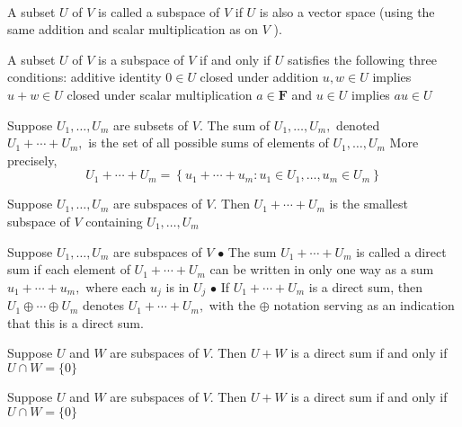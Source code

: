  \\

A subset $U$ of $V$ is called a subspace of $V$ if $U$ is also a vector space (using the same addition and scalar multiplication as on $V$ ).

A subset $U$ of $V$ is a subspace of $V$ if and only if $U$ satisfies the following three conditions:
additive identity
$0 \in U$
closed under addition $u, w \in U$ implies $u+w \in U$
closed under scalar multiplication
$a \in \mathbf{F}$ and $u \in U$ implies $a u \in U$

Suppose $U_{1}, \ldots, U_{m}$ are subsets of $V .$ The sum of $U_{1}, \ldots, U_{m},$ denoted $U_{1}+\cdots+U_{m},$ is the set of all possible sums of elements of $U_{1}, \ldots, U_{m}$ More precisely,
$$
U_{1}+\cdots+U_{m}=\left\{u_{1}+\cdots+u_{m}: u_{1} \in U_{1}, \ldots, u_{m} \in U_{m}\right\}
$$

Suppose $U_{1}, \ldots, U_{m}$ are subspaces of $V .$ Then $U_{1}+\cdots+U_{m}$ is the smallest subspace of $V$ containing $U_{1}, \ldots, U_{m}$

Suppose $U_{1}, \ldots, U_{m}$ are subspaces of $V$
$\bullet$ The sum $U_{1}+\cdots+U_{m}$ is called a direct sum if each element of $U_{1}+\cdots+U_{m}$ can be written in only one way as a sum $u_{1}+\cdots+u_{m},$ where each $u_{j}$ is in $U_{j}$
$\bullet$ If $U_{1}+\cdots+U_{m}$ is a direct sum, then $U_{1} \oplus \cdots \oplus U_{m}$ denotes $U_{1}+\cdots+U_{m},$ with the $\oplus$ notation serving as an indication that this is a direct sum.

Suppose $U$ and $W$ are subspaces of $V .$ Then $U+W$ is a direct sum if and only if $U \cap W=\{0\}$

Suppose $U$ and $W$ are subspaces of $V .$ Then $U+W$ is a direct sum if and only if $U \cap W=\{0\}$